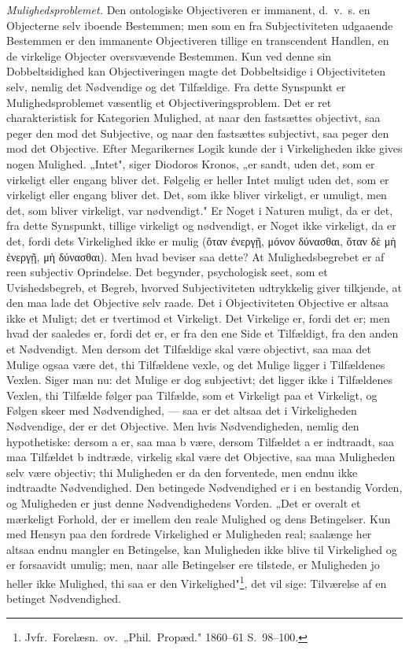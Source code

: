 \documentclass[12pt]{book}
\newcommand{\opage}[1]{\marginnote{\footnotesize\textit{[#1]}}}
\begin{document}
\emph{Mulighedsproblemet.} Den ontologiske Objectiveren er immanent, d.\ v.\ s. en Objecterne
selv iboende Bestemmen; men som en fra Subjectiviteten udgaaende Bestemmen er den immanente
Objectiveren tillige en transcendent Handlen, en de virkelige Objecter oversvævende Bestemmen.
Kun ved denne sin Dobbeltsidighed kan Objectiveringen magte det Dobbeltsidige i Objectiviteten
selv, nemlig det Nødvendige og det Tilfældige. Fra dette Synspunkt er Mulighedsproblemet
væsentlig et Objectiveringsproblem. Det er ret charakteristisk for Kategorien Mulighed, at naar
den fastsættes objectivt, saa peger den mod det Subjective, og naar den fastsættes subjectivt,
saa peger den mod det Objective. Efter Megarikernes Logik kunde der i Virkeligheden ikke gives
nogen Mulighed. „Intet", siger Diodoros Kronos, „er sandt, uden det, som er virkeligt eller
engang bliver det. Følgelig er heller Intet muligt uden det, som er virkeligt eller engang
bliver det. Det, som ikke bliver virkeligt, er umuligt, men det, som bliver virkeligt, var
nødvendigt." Er Noget i Naturen muligt, da er det, fra dette Synspunkt, tillige virkeligt og
nødvendigt, er Noget ikke virkeligt, da er det, fordi dets Virkelighed ikke er mulig (ὅταν
ἐνεργῇ, μόνον δύνασθαι, ὅταν δὲ μὴ ἐνεργῇ, μὴ δύνασθαι). Men hvad beviser saa dette? At
\opage{176} Mulighedsbegrebet er af reen subjectiv Oprindelse. Det begynder, psychologisk seet, som et
Uvishedsbegreb, et Begreb, hvorved Subjectiviteten udtrykkelig giver tilkjende, at den maa lade
det Objective selv raade. Det i Objectiviteten Objective er altsaa ikke et Muligt; det er
tvertimod et Virkeligt. Det Virkelige er, fordi det er; men hvad der saaledes er, fordi det er,
er fra den ene Side et Tilfældigt, fra den anden et Nødvendigt. Men dersom det Tilfældige skal
være objectivt, saa maa det Mulige ogsaa være det, thi Tilfældene vexle, og det Mulige ligger i
Tilfældenes Vexlen. Siger man nu: det Mulige er dog subjectivt; det ligger ikke i Tilfældenes
Vexlen, thi Tilfælde følger paa Tilfælde, som et Virkeligt paa et Virkeligt, og Følgen skeer med
Nødvendighed, --- saa er det altsaa det i Virkeligheden Nødvendige, der er det Objective. Men
hvis Nødvendigheden, nemlig den hypothetiske: dersom a er, saa maa b være, dersom Tilfældet a er
indtraadt, saa maa Tilfældet b indtræde, virkelig skal være det Objective, saa maa Muligheden
selv være objectiv; thi Muligheden er da den forventede, men endnu ikke indtraadte Nødvendighed.
Den betingede Nødvendighed er i en bestandig Vorden, og Muligheden er just denne
Nødvendighedens Vorden. „Det er overalt et mærkeligt Forhold, der er imellem den reale Mulighed
og dens Betingelser. Kun med Hensyn paa den fordrede Virkelighed er Muligheden real; saalænge
her altsaa endnu mangler en Betingelse, kan Muligheden ikke blive til Virkelighed og er
forsaavidt umulig; men, naar alle Betingelser ere tilstede, er Muligheden jo heller ikke
Mulighed, thi saa er den Virkelighed"\footnote{Jvfr.\ Forelæsn.\ ov.\ „Phil.\ Propæd." 1860--61
S.~98--100.}, det vil sige: Tilværelse af en betinget Nødvendighed.
\end{document}
